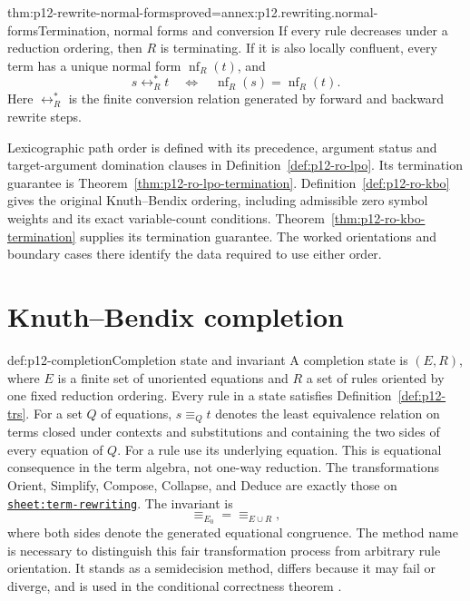 \begin{hblemma}{thm:p12-rewrite-normal-forms}{proved=annex:p12.rewriting.normal-forms}{Termination, normal forms and conversion}
If every rule decreases under a reduction ordering, then \(R\) is
terminating. If it is also locally confluent, every term has a unique
normal form \(\operatorname{nf}_R(t)\), and
\[
 s\mathrel{\leftrightarrow_R^*}t
 \quad\Longleftrightarrow\quad
 \operatorname{nf}_R(s)=\operatorname{nf}_R(t).
\]
Here \(\leftrightarrow_R^*\) is the finite conversion relation
generated by forward and backward rewrite steps.
\end{hblemma}

Lexicographic path order is defined with its precedence, argument status and
target-argument domination clauses in Definition~\ref{def:p12-ro-lpo}.
Its termination guarantee is Theorem~\ref{thm:p12-ro-lpo-termination}.
Definition~\ref{def:p12-ro-kbo} gives the original Knuth--Bendix ordering,
including admissible zero symbol weights and its exact variable-count
conditions. Theorem~\ref{thm:p12-ro-kbo-termination} supplies its termination
guarantee. The worked orientations and boundary cases there identify the
data required to use either order.



\section{Knuth--Bendix completion}

\begin{hbmethod}{def:p12-completion}{Completion state and invariant}
A completion state is \((E,R)\), where \(E\) is a finite set of unoriented
equations and \(R\) a set of rules oriented by one fixed reduction ordering.
Every rule in a state satisfies Definition~\ref{def:p12-trs}.
For a set \(Q\) of equations, \(s\equiv_Q t\) denotes the least
equivalence relation on terms closed under contexts and substitutions
and containing the two sides of every equation of \(Q\). For a rule
use its underlying equation. This is equational consequence in the term
algebra, not one-way reduction.
The transformations Orient, Simplify, Compose, Collapse, and Deduce are exactly
those on \hyperref[sheet:term-rewriting]{\texttt{sheet:term-rewriting}}. The
invariant is
\[
 \equiv_{E_0}=\equiv_{E\cup R},
\]
where both sides denote the generated equational congruence. The method name
is necessary to distinguish this fair transformation process from arbitrary
rule orientation. It stands as a semidecision method, differs because it may
fail or diverge, and is used in the conditional correctness theorem
\cite{KnuthBendix1970}.
\end{hbmethod}


